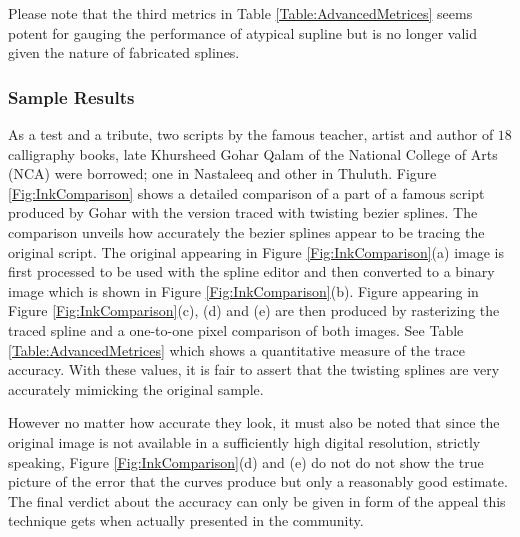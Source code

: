 
Please note that the third metrics in Table \ref{Table:AdvancedMetrices} seems potent for gauging the performance of atypical supline but is no longer valid given the nature of fabricated splines.

\subsubsection{Sample Results}
As a test and a tribute, two scripts by the famous teacher, artist and author of $18$ calligraphy books, late Khursheed Gohar Qalam \cite{bib23} of the National College of Arts (NCA) were borrowed; one in Nastaleeq and other in Thuluth. Figure \ref{Fig:InkComparison} shows a detailed comparison of a part of a famous script produced by Gohar with the version traced with twisting bezier splines. The comparison unveils how accurately the bezier splines appear to be tracing the original script. The original appearing in Figure \ref{Fig:InkComparison}(a) image is first processed to be used with the spline editor and then converted to a binary image which is shown in Figure \ref{Fig:InkComparison}(b). Figure appearing in Figure \ref{Fig:InkComparison}(c), (d) and (e) are then produced by rasterizing the traced spline and a one-to-one pixel comparison of both images. See Table \ref{Table:AdvancedMetrices} which shows a quantitative measure of the trace accuracy. With these values, it is fair to assert that the twisting splines are very accurately mimicking the original sample.

However no matter how accurate they look, it must also be noted that since the original image is not available in a sufficiently high digital resolution, strictly speaking, Figure \ref{Fig:InkComparison}(d) and (e) do not do not show the true picture of the error that the curves produce but only a reasonably good estimate. The final verdict about the accuracy can only be given in form of the appeal this technique gets when actually presented in the community.

